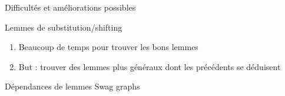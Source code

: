 \documentclass[10pt,xcolor={usenames,dvipsnames,svgnames,table}]{beamer}
\begin{document}
  \begin{frame}{Difficultés et améliorations possibles}
   \begin{block}{Lemmes de substitution/shifting}
    \begin{enumerate}
     \item Beaucoup de temps pour trouver les bons lemmes
     \item But : trouver des lemmes plus généraux dont les précédents se déduisent
     \end{enumerate}
   \end{block}

  \end{frame}
  
  \begin{frame}{Dépendances de lemmes}
  Swag graphs
  \end{frame}
  
\end{document}
